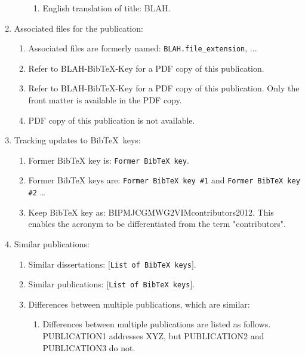 \documentclass[letter,12pt]{article}
\begin{document}
\begin{enumerate}
\begin{enumerate}
		\begin{enumerate} \itemsep -2pt
		\item English translation of title: BLAH.
		\end{enumerate}
	\end{enumerate}
\item Associated files for the publication: \vspace{-0.3cm}
	\begin{enumerate} \itemsep -2pt
	\item Associated files are formerly named: {\tt BLAH.file\_extension}, ...
	\item Refer to BLAH-BibTeX-Key for a PDF copy of this publication.
	\item Refer to BLAH-BibTeX-Key for a PDF copy of this publication. Only the front matter is available in the PDF copy.
	\item PDF copy of this publication is not available.
	\end{enumerate}
\item Tracking updates to {\sc Bib}\TeX\ keys: \vspace{-0.3cm}
	\begin{enumerate} \itemsep -2pt
	\item Former BibTeX key is: {\tt Former BibTeX key}.
	\item Former BibTeX keys are: {\tt Former BibTeX key \#1} and {\tt Former BibTeX key \#2} \dots
	\item Keep BibTeX key as: BIPMJCGMWG2VIMcontributors2012. This enables the acronym to be differentiated from the term "contributors".
	\end{enumerate}
\item Similar publications: \vspace{-0.3cm}
	\begin{enumerate} \itemsep -2pt
	\item Similar dissertations: $[${\tt List of {\rm {\sc Bib}\TeX}\ keys}$]$.
	\item Similar publications: $[${\tt List of {\rm {\sc Bib}\TeX}\ keys}$]$.
	\item Differences between multiple publications, which are similar: \vspace{-0.2cm}
		\begin{enumerate} \itemsep -2pt
		\item Differences between multiple publications are listed as follows. PUBLICATION1 addresses XYZ, but PUBLICATION2 and PUBLICATION3 do not.
		\end{enumerate}

\end{enumerate}
\end{enumerate}
\end{document}
